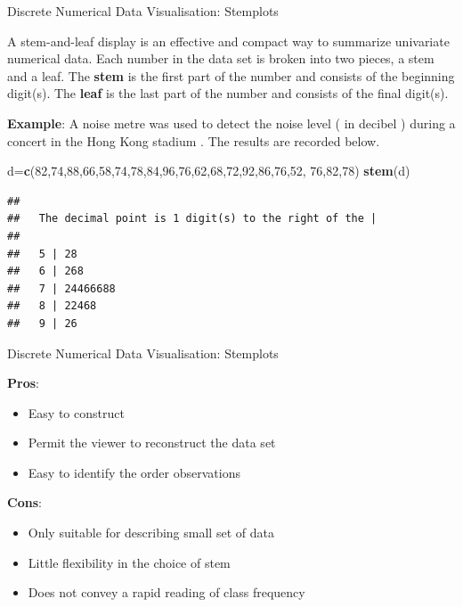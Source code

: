 \documentclass[ignorenonframetext,]{beamer}
\newenvironment{Shaded}{\begin{snugshade}}{\end{snugshade}}
\newcommand{\KeywordTok}[1]{\textcolor[rgb]{0.13,0.29,0.53}{\textbf{#1}}}
\newcommand{\DecValTok}[1]{\textcolor[rgb]{0.00,0.00,0.81}{#1}}
\newcommand{\NormalTok}[1]{#1}
\begin{document}
\begin{frame}[fragile]{Discrete Numerical Data Visualisation: Stemplots}

A stem-and-leaf display is an effective and compact way to summarize
univariate numerical data. Each number in the data set is broken into
two pieces, a stem and a leaf. The \textbf{stem} is the first part of
the number and consists of the beginning digit(s). The \textbf{leaf} is
the last part of the number and consists of the final digit(s).

\textbf{Example}: A noise metre was used to detect the noise level ( in
decibel ) during a concert in the Hong Kong stadium . The results are
recorded below.

\begin{Shaded}
\begin{Highlighting}[]
\NormalTok{d=}\KeywordTok{c}\NormalTok{(}\DecValTok{82}\NormalTok{,}\DecValTok{74}\NormalTok{,}\DecValTok{88}\NormalTok{,}\DecValTok{66}\NormalTok{,}\DecValTok{58}\NormalTok{,}\DecValTok{74}\NormalTok{,}\DecValTok{78}\NormalTok{,}\DecValTok{84}\NormalTok{,}\DecValTok{96}\NormalTok{,}\DecValTok{76}\NormalTok{,}\DecValTok{62}\NormalTok{,}\DecValTok{68}\NormalTok{,}\DecValTok{72}\NormalTok{,}\DecValTok{92}\NormalTok{,}\DecValTok{86}\NormalTok{,}\DecValTok{76}\NormalTok{,}\DecValTok{52}\NormalTok{,}
\DecValTok{76}\NormalTok{,}\DecValTok{82}\NormalTok{,}\DecValTok{78}\NormalTok{)}
\KeywordTok{stem}\NormalTok{(d)}
\end{Highlighting}
\end{Shaded}

\begin{verbatim}
## 
##   The decimal point is 1 digit(s) to the right of the |
## 
##   5 | 28
##   6 | 268
##   7 | 24466688
##   8 | 22468
##   9 | 26
\end{verbatim}

\end{frame}

\begin{frame}{Discrete Numerical Data Visualisation: Stemplots}

\textbf{Pros}:

\begin{itemize}
\item
  Easy to construct
\item
  Permit the viewer to reconstruct the data set
\item
  Easy to identify the order observations
\end{itemize}

\textbf{Cons}:

\begin{itemize}
\item
  Only suitable for describing small set of data
\item
  Little flexibility in the choice of stem
\item
  Does not convey a rapid reading of class frequency
\end{itemize}

\end{frame}
\end{document}
